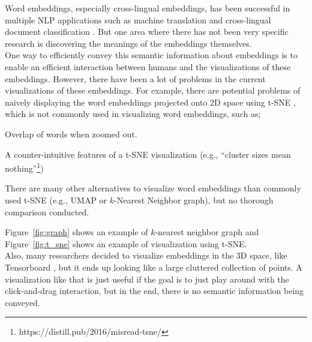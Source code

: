 Word embeddings, especially cross-lingual embeddings, has been successful in multiple NLP applications such as machine translation \cite{lample2018unsupervised, artetxe2018unsupervised} and cross-lingual document classification \cite{klementiev-titov-bhattarai:2012:PAPERS}. 
But one area where there has not been very specific research is discovering the meanings of the embeddings themselves. \\

One way to efficiently convey this semantic information about embeddings is to enable an efficient interaction between humans and the visualizations of these embeddings. However, there have been a lot of problems in the current visualizations of these embeddings.
For example, there are potential problems of naively displaying the word embeddings projected onto 2D space using t-SNE \cite{t-sne}, which is not commonly used in visualizing word embeddings, such as;
\begin{itemize*}
  \item Overlap of words when zoomed out. 
  \item A counter-intuitive features of a t-SNE visualization (e.g., ``cluster sizes mean nothing''\footnote{https://distill.pub/2016/misread-tsne/}) 
  \item There are many other alternatives to visualize word embeddings than commonly used t-SNE (e.g., UMAP \cite{umap} or $k$-Nearest Neighbor graph), but no thorough comparison conducted. 
\end{itemize*}
Figure~\ref{fig:graph} shows an example of $k$-nearest neighbor graph and Figure~\ref{fig:t_sne} shows an example of visualization using t-SNE. \\

Also, many researchers decided to visualize embeddings in the 3D space, like Tensorboard \cite{tensorboard_viz}, but it ends up looking like a large cluttered collection of points. A visualization like that is just useful if the goal is to just play around with the click-and-drag interaction, but in the end, there is no semantic information being conveyed. \\

